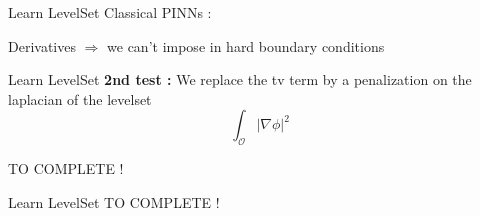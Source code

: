 \begin{frame}{Learn LevelSet }
	Classical PINNs :
	
	\begin{minipage}{0.26\linewidth}
	\end{minipage} \quad \begin{minipage}{0.70\linewidth}	
	\end{minipage}
	
	Derivatives $\Rightarrow$ we can't impose in hard boundary conditions
	
	\begin{center}
	\end{center}
\end{frame}

\begin{frame}{Learn LevelSet }
	\textbf{2nd test :} We replace the tv term by a penalization on the laplacian of the levelset
	\begin{equation*}
		\int_{\mathcal{O}} |\nabla \phi|^2
	\end{equation*}

	TO COMPLETE !

%
\end{frame}

\begin{frame}{Learn LevelSet }
	TO COMPLETE !
\end{frame}